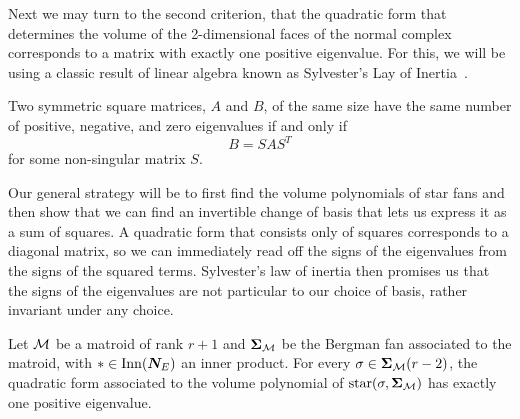 \documentclass[12pt,oneside]{../../sfsuthesis}
\begin{document}
Next we may turn to the second criterion, that the quadratic form that determines the volume of the 2-dimensional faces of the normal complex corresponds to a matrix with exactly one positive eigenvalue.
For this, we will be using a classic result of linear algebra known as Sylvester's Lay of Inertia~\cite{sylvesterXIXDemonstrationTheorem1852}.
\begin{proposition}\th\label{thm:sylvester}
    Two symmetric square matrices, \( A \) and \( B \), of the same size have the same number of positive, negative, and zero eigenvalues if and only if
    \[
        B = SAS^{T}
    \]
    for some non-singular matrix \( S \).
\end{proposition}
Our general strategy will be to first find the volume polynomials of star fans and then show that we can find an invertible change of basis that lets us express it as a sum of squares.
A quadratic form that consists only of squares corresponds to a diagonal matrix, so we can immediately read off the signs of the eigenvalues from the signs of the squared terms.
Sylvester's law of inertia then promises us that the signs of the eigenvalues are not particular to our choice of basis, rather invariant under any choice.
\begin{lemma}\th\label{thm:matroidOnePosEigen}

    Let \( \mathcal{M} \) be a matroid of rank \( r + 1 \) and \( {\bm{\Sigma}}_{\mathcal{M}} \) be the Bergman fan associated to the matroid, with \( \ast \in \mathrm{Inn}(\bm{N}_E) \) an inner product.
    For every \( \sigma \in {\bm{\Sigma}}_{\mathcal{M}}(r - 2) \), the quadratic form associated to the volume polynomial of \( \operatorname{star}(\sigma, {\bm{\Sigma}}_{\mathcal{M}}) \) has exactly one positive eigenvalue.

\end{lemma}
\end{document}

